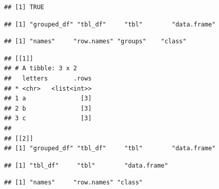 \documentclass[krantz2]{krantz}\usepackage{knitr}
\begin{document}
\begin{warningbox}
\begin{knitrout}\footnotesize
{}\color{fgcolor}\begin{kframe}
\begin{alltt}
 \hlkwb{<-} \hlstd{(} 
\end{alltt}
\begin{verbatim}
## [1] TRUE
\end{verbatim}
\begin{alltt}
\end{alltt}
\begin{verbatim}
## [1] "grouped_df" "tbl_df"     "tbl"        "data.frame"
\end{verbatim}
\end{kframe}
\end{knitrout}
\begin{knitrout}\footnotesize
{}\color{fgcolor}\begin{kframe}
\begin{alltt}
\hlstd{(}
\end{alltt}
\begin{verbatim}
## [1] "names"     "row.names" "groups"    "class"
\end{verbatim}
\begin{alltt}
\hlstd{(} 
\end{alltt}
\begin{verbatim}
## [[1]]
## # A tibble: 3 x 2
##   letters       .rows
## * <chr>   <list<int>>
## 1 a               [3]
## 2 b               [3]
## 3 c               [3]
##
## [[2]]
## [1] "grouped_df" "tbl_df"     "tbl"        "data.frame"
\end{verbatim}
\end{kframe}
\end{knitrout}

\begin{knitrout}\footnotesize
{}\color{fgcolor}\begin{kframe}
\begin{alltt}
 \hlkwb{<-} 
\end{alltt}
\begin{verbatim}
## [1] "tbl_df"     "tbl"        "data.frame"
\end{verbatim}
\begin{alltt}
\hlstd{(}
\end{alltt}
\begin{verbatim}
## [1] "names"     "row.names" "class"
\end{verbatim}
\end{kframe}
\end{knitrout}


\end{warningbox}
\end{document}

